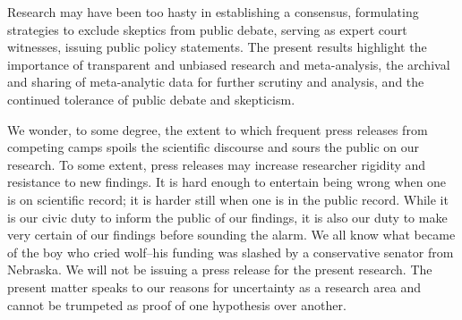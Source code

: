 \documentclass[man]{apa6}
\begin{document}
Research may have been too hasty in establishing a consensus, formulating strategies to exclude skeptics from public debate, serving as expert court witnesses, issuing public policy statements. The present results highlight the importance of transparent and unbiased research and meta-analysis, the archival and sharing of meta-analytic data for further scrutiny and analysis, and the continued tolerance of public debate and skepticism.

We wonder, to some degree, the extent to which frequent press releases from competing camps spoils the scientific discourse and sours the public on our research. 
To some extent, press releases may increase researcher rigidity and resistance to new findings. It is hard enough to entertain being wrong when one is on scientific record; it is harder still when one is in the public record.
While it is our civic duty to inform the public of our findings, it is also our duty to make very certain of our findings before sounding the alarm. We all know what became of the boy who cried wolf--his funding was slashed by a conservative senator from Nebraska. 
We will not be issuing a press release for the present research. The present matter speaks to our reasons for uncertainty as a research area and cannot be trumpeted as proof of one hypothesis over another. 

\end{document}
